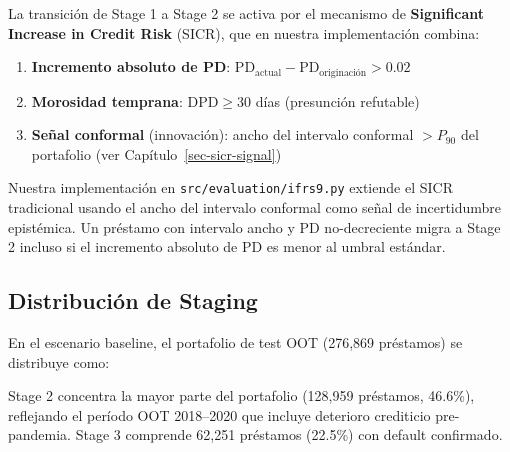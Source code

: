 \documentclass[
  spanish,
  11pt,
  letterpaper,
]{scrbook}
\providecommand{\tightlist}{%
  \setlength{\itemsep}{0pt}\setlength{\parskip}{0pt}}
\theoremstyle{plain}
\theoremstyle{remark}
\begin{document}
La transición de Stage 1 a Stage 2 se activa por el mecanismo de
\textbf{Significant Increase in Credit Risk} (SICR), que en nuestra
implementación combina:

\begin{enumerate}
\def\labelenumi{\arabic{enumi}.}
\tightlist
\item
  \textbf{Incremento absoluto de PD}:
  \(\text{PD}_{\text{actual}} - \text{PD}_{\text{originación}} > 0.02\)
\item
  \textbf{Morosidad temprana}: \(\text{DPD} \geq 30\) días (presunción
  refutable)
\item
  \textbf{Señal conformal} (innovación): ancho del intervalo conformal
  \(> P_{90}\) del portafolio (ver Capítulo~\ref{sec-sicr-signal})
\end{enumerate}

\begin{tcolorbox}[enhanced jigsaw, arc=.35mm, bottomrule=.15mm, bottomtitle=1mm, breakable, colback=white, colbacktitle=quarto-callout-note-color!10!white, colframe=quarto-callout-note-color-frame, coltitle=black, left=2mm, leftrule=.75mm, opacityback=0, opacitybacktitle=0.6, rightrule=.15mm, title=\textcolor{quarto-callout-note-color}{\faInfo}\hspace{0.5em}{Innovación: SICR Conformal}, titlerule=0mm, toprule=.15mm, toptitle=1mm]

Nuestra implementación en \texttt{src/evaluation/ifrs9.py} extiende el
SICR tradicional usando el ancho del intervalo conformal como señal de
incertidumbre epistémica. Un préstamo con intervalo ancho y PD
no-decreciente migra a Stage 2 incluso si el incremento absoluto de PD
es menor al umbral estándar.

\end{tcolorbox}

\subsection{Distribución de Staging}\label{distribuciuxf3n-de-staging}

En el escenario baseline, el portafolio de test OOT (276,869 préstamos)
se distribuye como:

Stage 2 concentra la mayor parte del portafolio (128,959 préstamos,
46.6\%), reflejando el período OOT 2018--2020 que incluye deterioro
crediticio pre-pandemia. Stage 3 comprende 62,251 préstamos (22.5\%) con
default confirmado.
\end{document}
